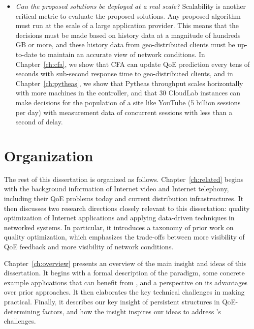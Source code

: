 \begin{itemize}
\item {\em Can the proposed solutions be deployed at a real scale?}
Scalability is another critical metric to evaluate the proposed solutions. 
Any proposed algorithm must run at the scale of a large application 
provider.
This means that the decisions must be made 
based on history data at a magnitude of hundreds GB or more, and 
these history data from geo-distributed 
clients must be up-to-date to maintain an accurate view of network conditions.
In Chapter~\ref{ch:cfa}, we show that CFA can update QoE 
prediction every tens of seconds with sub-second response 
time to geo-distributed clients, 
and in Chapter~\ref{ch:pytheas}, we show that Pytheas throughput 
scales horizontally with more machines in the controller, and that 
30 CloudLab instances can make decisions for the population of a site
like YouTube (5 billion sessions per day) with measurement data of 
concurrent sessions with less than a second of delay.

\end{itemize}



\section{Organization}
The rest of this dissertation is organized as follows.
Chapter~\ref{ch:related} begins with the background information of
Internet video and Internet telephony, including their QoE problems
today and current distribution infrastructures.
It then discusses two research directions closely 
relevant to this dissertation: 
quality optimization of Internet applications and applying data-driven 
techniques in networked systems.
In particular, it introduces a taxonomy of prior work on quality 
optimization, which emphasizes the trade-offs between 
more visibility of QoE feedback and more visibility of network
conditions.

Chapter~\ref{ch:overview} presents an overview of the main insight and 
ideas of this dissertation.
It begins with a formal description of the \ddn paradigm, some
concrete example applications that can benefit from \ddn, and a
perspective on its advantages over prior approaches.
It then elaborates the key technical challenges in making \ddn practical. 
Finally, it describes our key insight of persistent structures in 
QoE-determining factors, and how the insight inspires our ideas to 
address \ddn's challenges.

